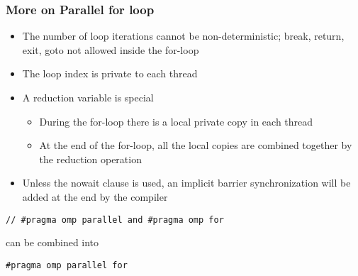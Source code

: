 \documentclass{beamer}
\begin{document}
\begin{frame}
\frametitle{More on Parallel for loop}

\begin{block}{}
\begin{itemize}
\item The number of loop iterations cannot be non-deterministic; break, return, exit, goto not allowed inside the for-loop

\item The loop index is private to each thread

\item A reduction variable is special
\begin{itemize}

  \item During the for-loop there is a local private copy in each thread

  \item At the end of the for-loop, all the local copies are combined together by the reduction operation

\end{itemize}

\noindent
\item Unless the nowait clause is used, an implicit barrier synchronization will be added at the end by the compiler
\end{itemize}

\noindent


\begin{verbatim}
// #pragma omp parallel and #pragma omp for

\end{verbatim}

can be combined into


\begin{verbatim}
#pragma omp parallel for

\end{verbatim}

\end{block}
\end{frame}
\end{document}
